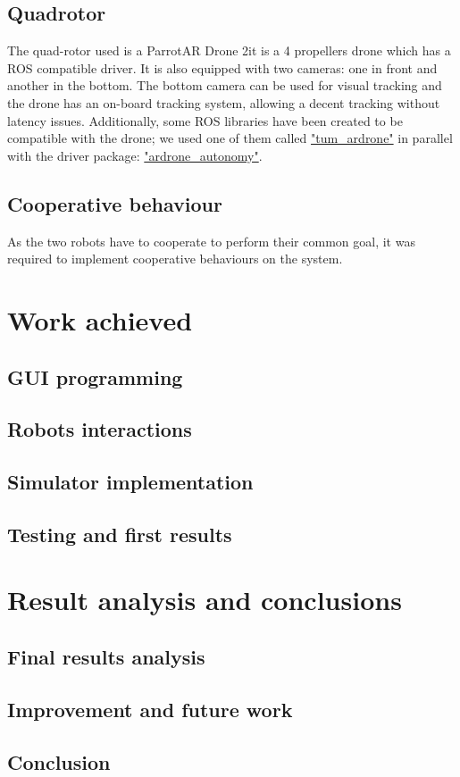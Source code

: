 \documentclass[11pt,a4paper]{article}
\begin{document}
\subsection{Quadrotor}
The quad-rotor used is a Parrot\textcopyright AR Drone 2\texttrademark it is a 4 propellers
drone which has a ROS compatible driver. It is also equipped with two cameras: one in front
and another in the bottom. The bottom camera can be used for visual tracking and the drone
has an on-board tracking system, allowing a decent tracking without latency issues.
Additionally, some ROS libraries have been created to be compatible with the drone; we used
one of them called \href{"http://wiki.ros.org/tum_ardrone"}{"tum\_ardrone"} in parallel with
the driver package: \href{"https://github.com/AutonomyLab/ardrone_autonomy"}
{"ardrone\_autonomy"}.

\subsection{Cooperative behaviour}
As the two robots have to cooperate to perform their common goal, it was required to implement
cooperative behaviours on the system.




\section{Work achieved}
\subsection{GUI programming}
\subsection{Robots interactions}
\subsection{Simulator implementation}
\subsection{Testing and first results}

\section{Result analysis and conclusions}
\subsection{Final results analysis}
\subsection{Improvement and future work}
\subsection{Conclusion}




\end{document}
